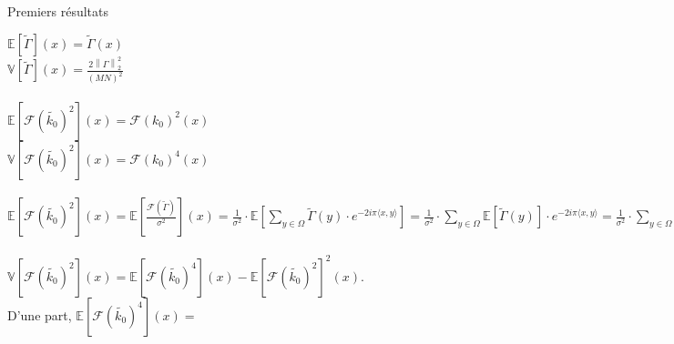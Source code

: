 \documentclass{article} %
\begin{document}
\begin{section}{Premiers résultats}

$\mathbb{E}[\tilde{\Gamma}](x) = \tilde{\Gamma}(x) $\\
$\mathbb{V}[\tilde{\Gamma}](x) = \frac{2 {\left\| \Gamma \right\|}^2_2}{(MN)^2}$
\\
\\
$\mathbb{E}[\mathcal{F}(\tilde{k_0})^2](x) = \mathcal{F}({k_0})^2(x)$
\\
$\mathbb{V}[\mathcal{F}(\tilde{k_0})^2](x) = \mathcal{F}({k_0})^4(x)$
\\
\\
$\mathbb{E}[\mathcal{F}(\tilde{k_0})^2](x) = \mathbb{E}[\frac{\mathcal{F}(\tilde{\Gamma})}{\sigma^2}](x) = \frac{1}{\sigma^2}\cdot \mathbb{E}[\sum_{ y \in \Omega}{\tilde\Gamma(y) \cdot e^{-2i \pi \langle x,y \rangle}}] = \frac{1}{\sigma^2}\cdot \sum_{ y \in \Omega}{\mathbb{E}[\tilde\Gamma(y)] \cdot e^{-2i \pi \langle x,y \rangle}} = 
\frac{1}{\sigma^2}\cdot \sum_{ y \in \Omega}{\Gamma(y) \cdot e^{-2i \pi \langle x,y \rangle}} =\frac{1}{\sigma^2}\cdot \mathcal{F}(\Gamma)(x) =\mathcal{F}(A(k_0))(x) = \mathcal{F}(k_0)^2(x) $
\\
\\
$\mathbb{V}[\mathcal{F}(\tilde{k_0})^2](x) = \mathbb{E}[\mathcal{F}(\tilde{k_0})^4](x) - \mathbb{E}[\mathcal{F}(\tilde{k_0})^2]^2(x)$.
\\
D'une part, $\mathbb{E}[\mathcal{F}(\tilde{k_0})^4](x) = $


\end{section}
\end{document}
